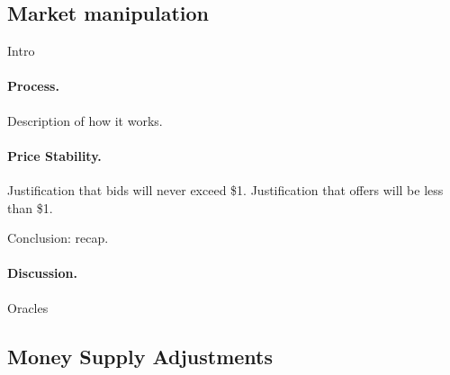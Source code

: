 
\subsection{Market manipulation}
\label{sec:board}

Intro

\paragraph{Process.} Description of how it works.

\paragraph{Price Stability.} Justification that bids will never exceed \$1. Justification that offers will be less than \$1.

Conclusion: recap.

\paragraph{Discussion.} Oracles





\subsection{Money Supply Adjustments}
\label{sec:elastic}

